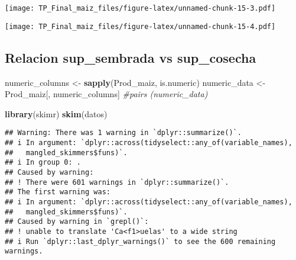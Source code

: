 \documentclass[
]{article}
\newenvironment{Shaded}{\begin{snugshade}}{\end{snugshade}}
\newcommand{\CommentTok}[1]{\textcolor[rgb]{0.56,0.35,0.01}{\textit{#1}}}
\newcommand{\FunctionTok}[1]{\textcolor[rgb]{0.13,0.29,0.53}{\textbf{#1}}}
\newcommand{\NormalTok}[1]{#1}
\newcommand{\OtherTok}[1]{\textcolor[rgb]{0.56,0.35,0.01}{#1}}
\newcommand{\SpecialCharTok}[1]{\textcolor[rgb]{0.81,0.36,0.00}{\textbf{#1}}}
\begin{document}
\texttt{[image: TP\_Final\_maiz\_files/figure-latex/unnamed-chunk-15-3.pdf]}

\begin{Shaded}
\end{Shaded}

\texttt{[image: TP\_Final\_maiz\_files/figure-latex/unnamed-chunk-15-4.pdf]}

\hypertarget{relacion-sup_sembrada-vs-sup_cosecha}{%
\subsection{Relacion sup\_sembrada vs
sup\_cosecha}\label{relacion-sup_sembrada-vs-sup_cosecha}}

\begin{Shaded}
\begin{Highlighting}[]
\NormalTok{numeric\_columns }\OtherTok{\textless{}{-}} \FunctionTok{sapply}\NormalTok{(Prod\_maiz, is.numeric)}
\NormalTok{numeric\_data }\OtherTok{\textless{}{-}}\NormalTok{ Prod\_maiz[, numeric\_columns]}
\CommentTok{\#pairs (numeric\_data)}
\end{Highlighting}
\end{Shaded}

\begin{Shaded}
\begin{Highlighting}[]
\FunctionTok{library}\NormalTok{(skimr)}
\FunctionTok{skim}\NormalTok{(datos)}
\end{Highlighting}
\end{Shaded}

\begin{verbatim}
## Warning: There was 1 warning in `dplyr::summarize()`.
## i In argument: `dplyr::across(tidyselect::any_of(variable_names),
##   mangled_skimmers$funs)`.
## i In group 0: .
## Caused by warning:
## ! There were 601 warnings in `dplyr::summarize()`.
## The first warning was:
## i In argument: `dplyr::across(tidyselect::any_of(variable_names),
##   mangled_skimmers$funs)`.
## Caused by warning in `grepl()`:
## ! unable to translate 'Ca<f1>uelas' to a wide string
## i Run `dplyr::last_dplyr_warnings()` to see the 600 remaining warnings.
\end{verbatim}
\end{document}
